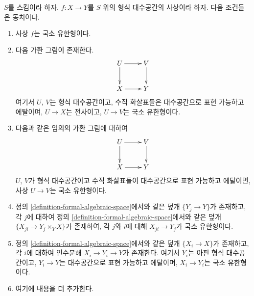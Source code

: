 \begin{lemma}
\label{lemma-finite-type-local}
$S$를 스킴이라 하자. $f : X \to Y$를 $S$ 위의 형식 대수공간의
사상이라 하자. 다음 조건들은 동치이다.
\begin{enumerate}
\item 사상 $f$는 국소 유한형이다.
\item 다음 가환 그림이 존재한다.
$$
\xymatrix{
U \ar[d] \ar[r] & V \ar[d] \\
X \ar[r] & Y
}
$$
여기서 $U$, $V$는 형식 대수공간이고, 수직 화살표들은 대수공간으로
표현 가능하고 에탈이며, $U \to X$는 전사이고, $U \to V$는 국소
유한형이다.
\item 다음과 같은 임의의 가환 그림에 대하여
$$
\xymatrix{
U \ar[d] \ar[r] & V \ar[d] \\
X \ar[r] & Y
}
$$
$U$, $V$가 형식 대수공간이고 수직 화살표들이 대수공간으로 표현
가능하고 에탈이면, 사상 $U \to V$는 국소 유한형이다.
\item 정의 \ref{definition-formal-algebraic-space}에서와 같은 덮개
$\{Y_j \to Y\}$가 존재하고, 각 $j$에 대하여 정의
\ref{definition-formal-algebraic-space}에서와 같은 덮개
$\{X_{ji} \to Y_j \times_Y X\}$가 존재하여, 각 $j$와 $i$에 대해
$X_{ji} \to Y_j$가 국소 유한형이다.
\item 정의 \ref{definition-formal-algebraic-space}에서와 같은 덮개
$\{X_i \to X\}$가 존재하고, 각 $i$에 대하여 인수분해
$X_i \to Y_i \to Y$가 존재한다. 여기서 $Y_i$는 아핀 형식
대수공간이고, $Y_i \to Y$는 대수공간으로 표현 가능하고 에탈이며,
$X_i \to Y_i$는 국소 유한형이다.
\item 여기에 내용을 더 추가한다. %
\end{enumerate}
\end{lemma}


